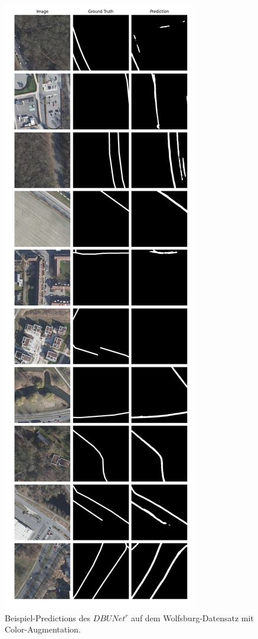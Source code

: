 \begin{figure}
	\centering
	\includegraphics[width=.41\textwidth]{Bilder/wolfsburg-color-samples/dbunet-r.png}
	\caption{Beispiel-Predictions des $DBUNet^r$ auf dem Wolfsburg-Datensatz mit Color-Augmentation.}
	\label{fig:wolfsburg-color-samples-dbunet-r}
\end{figure}

